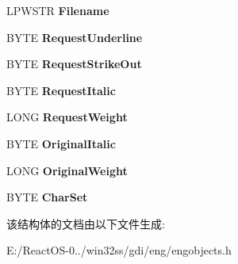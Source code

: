 \begin{DoxyCompactItemize}
L\+P\+W\+S\+TR {\bfseries Filename}
\item 
\mbox{\label{struct___f_o_n_t_g_d_i_aec0deb4a62ee6c3b69b6689812b6496b}} 
B\+Y\+TE {\bfseries Request\+Underline}
\item 
\mbox{\label{struct___f_o_n_t_g_d_i_a4ff736632233e489a6d4d86957020d55}} 
B\+Y\+TE {\bfseries Request\+Strike\+Out}
\item 
\mbox{\label{struct___f_o_n_t_g_d_i_a249c0f7036daeff122c57641bb27fe86}} 
B\+Y\+TE {\bfseries Request\+Italic}
\item 
\mbox{\label{struct___f_o_n_t_g_d_i_a255d942391e6874b9266791ceedb41cb}} 
L\+O\+NG {\bfseries Request\+Weight}
\item 
\mbox{\label{struct___f_o_n_t_g_d_i_a6164e0d6ad6a2717c463f03e1457434b}} 
B\+Y\+TE {\bfseries Original\+Italic}
\item 
\mbox{\label{struct___f_o_n_t_g_d_i_addf8ee91708345d959230e9732f7123d}} 
L\+O\+NG {\bfseries Original\+Weight}
\item 
\mbox{\label{struct___f_o_n_t_g_d_i_a7987f1a3324008e3475a4f7eb6e5b167}} 
B\+Y\+TE {\bfseries Char\+Set}
\end{DoxyCompactItemize}


该结构体的文档由以下文件生成\+:\begin{DoxyCompactItemize}
\item 
E\+:/\+React\+O\+S-\/0../win32ss/gdi/eng/engobjects.\+h\end{DoxyCompactItemize}
